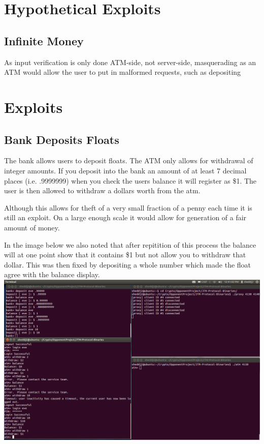 \documentclass{article}
\begin{document}
\section{Hypothetical Exploits}

\subsection{Infinite Money}
As input verification is only done ATM-side, not server-side, masquerading as an ATM would allow the user to put in malformed requests, such as depositing 

\section{Exploits}

\subsection{Bank Deposits Floats}

The bank allows users to deposit floats. The ATM only allows for withdrawal of integer amounts. If you deposit into the bank an amount of at least 7 decimal places (i.e. .9999999)
when you check the users balance it will register as \$1. The user is then allowed to withdraw a dollars worth from the atm.

Although this allows for theft of a very small fraction of a penny each time it is still an exploit. On a large enough scale it would allow for generation of a fair amount of money.

In the image below we also noted that after repitition of this process the balance will at one point show that it contains \$1 but not allow you to withdraw that dollar. This was then fixed by depositing a whole number which made the float agree with the balance display.
\\
\includegraphics[scale=0.5]{StrangeFloatBehavior.png}
\\
\end{document}
